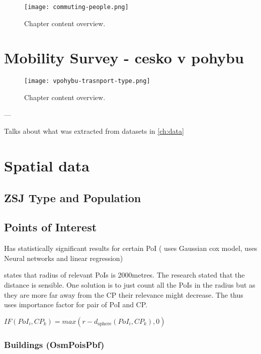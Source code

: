\begin{figure}[hb]
    \texttt{[image: commuting-people.png]}
    \caption[Problem modelling overview]{Chapter content overview. }
\end{figure}

\section{Mobility Survey - cesko v pohybu}

\begin{figure}[hb]
    \texttt{[image: vpohybu-trasnport-type.png]}
    \caption[Problem modelling overview]{Chapter content overview. }
\end{figure}

---

Talks about what was extracted from datasets in \ref{ch:data}

\section{Spatial data}

\subsection{ZSJ Type and Population}

\subsection{Points of Interest}

Has statistically significant results for certain PoI \cite{hechtGlobalElectricVehicle2024}\cite{dongElectricVehicleCharging2019}
(\cite{dongElectricVehicleCharging2019} uses Gaussian cox model, \cite{hechtGlobalElectricVehicle2024} uses Neural networks and linear regression)

\cite{hechtGlobalElectricVehicle2024} states that radius of relevant PoIs is 2000metres. The research stated that the distance is sensible.
One solution is to just count all the PoIs in the radius but as they are more far away from the CP their relevance might decrease. The \cite{hechtGlobalElectricVehicle2024} thus uses importance factor for pair of PoI and CP.

$IF(PoI_i, CP_k) = max(r-d_{\text{sphere}}(PoI_i, CP_k),0)$


\subsubsection{Buildings (OsmPoisPbf)}



